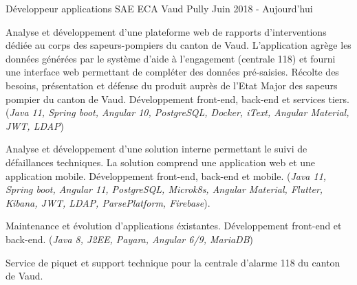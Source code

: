 


\begin{cventries}


\cventry
{Développeur applications SAE} %
{ECA Vaud} %
{Pully} %
{Juin 2018 - Aujourd'hui} %
{ %
\begin{cvitems}
\item {Analyse et développement d'une plateforme web de rapports d'interventions dédiée au corps des sapeurs-pompiers du canton de Vaud.
L'application agrège les données générées par le système d'aide à l'engagement (centrale 118) et fourni une interface web permettant de compléter des données pré-saisies.
Récolte des besoins, présentation et défense du produit auprès de l'Etat Major des sapeurs pompier du canton de Vaud. Développement front-end, back-end et services tiers.
(\emph{Java 11, Spring boot, Angular 10, PostgreSQL, Docker, iText, Angular Material, JWT, LDAP})}
\item {Analyse et développement d'une solution interne permettant le suivi de défaillances techniques. La solution comprend une application web et une application mobile. Développement front-end, back-end et mobile. (\emph{Java 11, Spring boot, Angular 11, PostgreSQL, Microk8s, Angular Material, Flutter, Kibana, JWT, LDAP, ParsePlatform, Firebase}).}
\item {Maintenance et évolution d'applications éxistantes. Développement front-end et back-end. (\emph{Java 8, J2EE, Payara, Angular 6/9, MariaDB})}
\item {Service de piquet et support technique pour la centrale d'alarme 118 du canton de Vaud.}
\end{cvitems}
}



\end{cventries}
